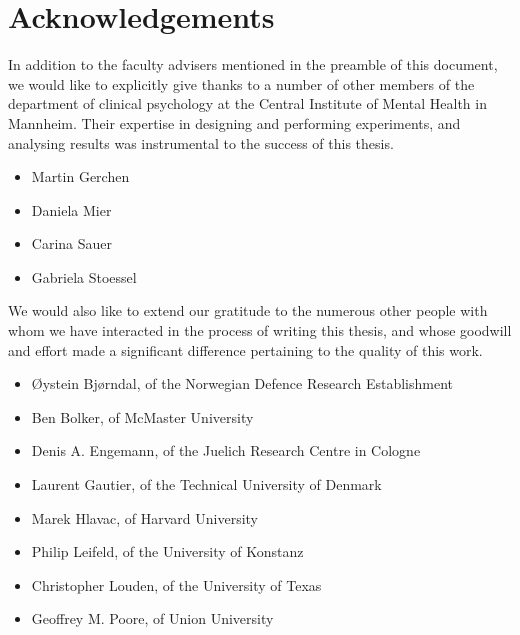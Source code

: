 \chapter{Acknowledgements}
    In addition to the faculty advisers mentioned in the preamble of this document, we would like to explicitly give thanks to a number of other members of the department of clinical psychology at the Central Institute of Mental Health in Mannheim.
    Their expertise in designing and performing experiments, and analysing results was instrumental to the success of this thesis.
    \begin{multicols}{2}
	\begin{itemize}
	    \item Martin Gerchen
	    \item Daniela Mier
	    \item Carina Sauer
	    \item Gabriela Stoessel
	\end{itemize}
    \end{multicols}
    \vspace{0.5cm}
    We would also like to extend our gratitude to the numerous other people with whom we have interacted in the process of writing this thesis, and whose goodwill and effort made a significant difference pertaining to the quality of this work.
    \begin{itemize}
	\item Øystein Bjørndal, of the Norwegian Defence Research Establishment
	\item Ben Bolker, of McMaster University
        \item Denis A. Engemann, of the Juelich Research Centre in Cologne
	\item Laurent Gautier, of the Technical University of Denmark
	\item Marek Hlavac, of Harvard University
	\item Philip Leifeld, of the University of Konstanz
	\item Christopher Louden, of the University of Texas
	\item Geoffrey M. Poore, of Union University
    \end{itemize}
